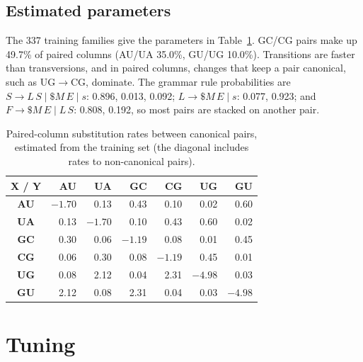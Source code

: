 \documentclass[10pt, twocolumn]{article}
\begin{document}
\subsection{Estimated parameters}
The 337 training families give the parameters in Table~\ref{tab:parameters}. GC/CG pairs make up 49.7\% of paired columns (AU/UA 35.0\%, GU/UG 10.0\%). Transitions are faster than transversions, and in paired columns, changes that keep a pair canonical, such as UG$\to$CG, dominate. The grammar rule probabilities are $S\to L\,S \mid \$M\,E \mid s$: 0.896, 0.013, 0.092; $L\to\$M\,E \mid s$: 0.077, 0.923; and $F\to\$M\,E \mid L\,S$: 0.808, 0.192, so most pairs are stacked on another pair.

\begin{table}[h]
\centering\small
\setlength{\tabcolsep}{3.5pt}
\begin{tabular}{c|rrrrrr}
\toprule
\textbf{X / Y} & \textbf{AU} & \textbf{UA} & \textbf{GC} & \textbf{CG} & \textbf{UG} & \textbf{GU}\\
\midrule
\textbf{AU} & $-1.70$ & 0.13 & 0.43 & 0.10 & 0.02 & 0.60 \\
\textbf{UA} & 0.13 & $-1.70$ & 0.10 & 0.43 & 0.60 & 0.02 \\
\textbf{GC} & 0.30 & 0.06 & $-1.19$ & 0.08 & 0.01 & 0.45 \\
\textbf{CG} & 0.06 & 0.30 & 0.08 & $-1.19$ & 0.45 & 0.01 \\
\textbf{UG} & 0.08 & 2.12 & 0.04 & 2.31 & $-4.98$ & 0.03 \\
\textbf{GU} & 2.12 & 0.08 & 2.31 & 0.04 & 0.03 & $-4.98$ \\
\bottomrule
\end{tabular}
\caption{Paired-column substitution rates between canonical pairs, estimated from the training set (the diagonal includes rates to non-canonical pairs).}
\label{tab:parameters}
\end{table}

\section{Tuning}
\label{sec:tuning}
\end{document}
